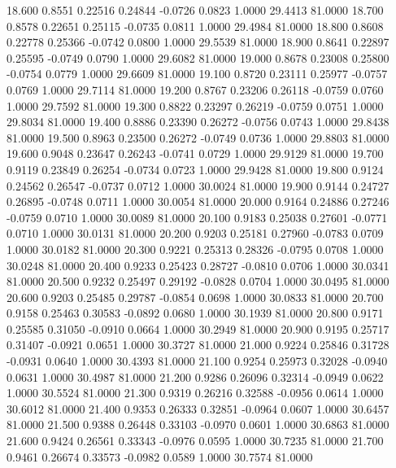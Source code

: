   18.600   0.8551   0.22516   0.24844  -0.0726   0.0823   1.0000  29.4413  81.0000
  18.700   0.8578   0.22651   0.25115  -0.0735   0.0811   1.0000  29.4984  81.0000
  18.800   0.8608   0.22778   0.25366  -0.0742   0.0800   1.0000  29.5539  81.0000
  18.900   0.8641   0.22897   0.25595  -0.0749   0.0790   1.0000  29.6082  81.0000
  19.000   0.8678   0.23008   0.25800  -0.0754   0.0779   1.0000  29.6609  81.0000
  19.100   0.8720   0.23111   0.25977  -0.0757   0.0769   1.0000  29.7114  81.0000
  19.200   0.8767   0.23206   0.26118  -0.0759   0.0760   1.0000  29.7592  81.0000
  19.300   0.8822   0.23297   0.26219  -0.0759   0.0751   1.0000  29.8034  81.0000
  19.400   0.8886   0.23390   0.26272  -0.0756   0.0743   1.0000  29.8438  81.0000
  19.500   0.8963   0.23500   0.26272  -0.0749   0.0736   1.0000  29.8803  81.0000
  19.600   0.9048   0.23647   0.26243  -0.0741   0.0729   1.0000  29.9129  81.0000
  19.700   0.9119   0.23849   0.26254  -0.0734   0.0723   1.0000  29.9428  81.0000
  19.800   0.9124   0.24562   0.26547  -0.0737   0.0712   1.0000  30.0024  81.0000
  19.900   0.9144   0.24727   0.26895  -0.0748   0.0711   1.0000  30.0054  81.0000
  20.000   0.9164   0.24886   0.27246  -0.0759   0.0710   1.0000  30.0089  81.0000
  20.100   0.9183   0.25038   0.27601  -0.0771   0.0710   1.0000  30.0131  81.0000
  20.200   0.9203   0.25181   0.27960  -0.0783   0.0709   1.0000  30.0182  81.0000
  20.300   0.9221   0.25313   0.28326  -0.0795   0.0708   1.0000  30.0248  81.0000
  20.400   0.9233   0.25423   0.28727  -0.0810   0.0706   1.0000  30.0341  81.0000
  20.500   0.9232   0.25497   0.29192  -0.0828   0.0704   1.0000  30.0495  81.0000
  20.600   0.9203   0.25485   0.29787  -0.0854   0.0698   1.0000  30.0833  81.0000
  20.700   0.9158   0.25463   0.30583  -0.0892   0.0680   1.0000  30.1939  81.0000
  20.800   0.9171   0.25585   0.31050  -0.0910   0.0664   1.0000  30.2949  81.0000
  20.900   0.9195   0.25717   0.31407  -0.0921   0.0651   1.0000  30.3727  81.0000
  21.000   0.9224   0.25846   0.31728  -0.0931   0.0640   1.0000  30.4393  81.0000
  21.100   0.9254   0.25973   0.32028  -0.0940   0.0631   1.0000  30.4987  81.0000
  21.200   0.9286   0.26096   0.32314  -0.0949   0.0622   1.0000  30.5524  81.0000
  21.300   0.9319   0.26216   0.32588  -0.0956   0.0614   1.0000  30.6012  81.0000
  21.400   0.9353   0.26333   0.32851  -0.0964   0.0607   1.0000  30.6457  81.0000
  21.500   0.9388   0.26448   0.33103  -0.0970   0.0601   1.0000  30.6863  81.0000
  21.600   0.9424   0.26561   0.33343  -0.0976   0.0595   1.0000  30.7235  81.0000
  21.700   0.9461   0.26674   0.33573  -0.0982   0.0589   1.0000  30.7574  81.0000
